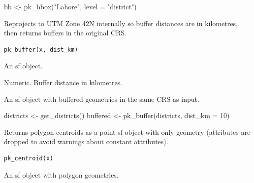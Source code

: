 \documentclass[a4paper]{book}
\begin{document}
%
\begin{Examples}
\begin{ExampleCode}

  bb <- pk_bbox("Lahore", level = "district")

\end{ExampleCode}
\end{Examples}
%
\begin{Description}
Reprojects to UTM Zone 42N internally so buffer distances are
in kilometres, then returns buffers in the original CRS.
\end{Description}
%
\begin{Usage}
\begin{verbatim}
pk_buffer(x, dist_km)
\end{verbatim}
\end{Usage}
%
\begin{Arguments}
\begin{ldescription}
\item[\code{x}] An sf object.

\item[\code{dist\_km}] Numeric. Buffer distance in kilometres.
\end{ldescription}
\end{Arguments}
%
\begin{Value}
An sf object with buffered geometries in the same CRS as input.
\end{Value}
%
\begin{Examples}
\begin{ExampleCode}

  districts <- get_districts()
  buffered  <- pk_buffer(districts, dist_km = 10)

\end{ExampleCode}
\end{Examples}
%
\begin{Description}
Returns polygon centroids as a point sf object with only geometry
(attributes are dropped to avoid warnings about constant attributes).
\end{Description}
%
\begin{Usage}
\begin{verbatim}
pk_centroid(x)
\end{verbatim}
\end{Usage}
%
\begin{Arguments}
\begin{ldescription}
\item[\code{x}] An sf object with polygon geometries.
\end{ldescription}
\end{Arguments}
\end{document}
